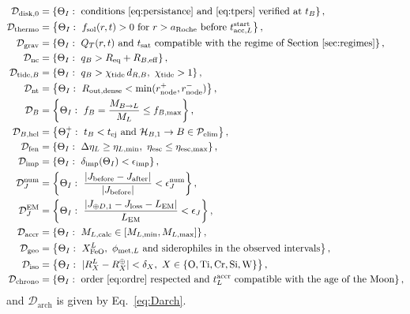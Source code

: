 \documentclass[11pt,a4paper,openany]{report}
\newcommand{\Req}{R_{\mathrm{eq}}}
\newcommand{\aR}{a_{\mathrm{Roche}}}
\begin{document}
\begin{align}
\mathcal{D}_{\mathrm{disk},0}&=\left\{\Theta_I:\ \text{conditions~\eqref{eq:persistance} and~\eqref{eq:tpers} verified at }t_B\right\},
\label{eq:Ddisque}\\
\mathcal{D}_{\mathrm{thermo}}&=\left\{\Theta_I:\ f_{\mathrm{sol}}(r,t)>0\ \text{for }r>\aR\ \text{before }
t^{\mathrm{start}}_{\mathrm{acc},L}\right\},
\label{eq:Dthermo}\\
\mathcal{D}_{\mathrm{grav}}&=\left\{\Theta_I:\ Q_T(r,t)\ \text{and}\ t_{\mathrm{sat}}\ \text{compatible with the regime of Section~\ref{sec:regimes}}\right\},
\label{eq:Dgrav}\\
\mathcal{D}_{\mathrm{nc}}&=\left\{\Theta_I:\ q_B>\Req+R_{B,\mathrm{eff}}\right\},
\label{eq:Dnc}\\
\mathcal{D}_{\mathrm{tide},B}&=\left\{\Theta_I:\ q_B>\chi_{\mathrm{tide}}\,d_{R,B},\ \chi_{\mathrm{tide}}>1\right\},
\label{eq:DtideB}\\
\mathcal{D}_{\mathrm{nt}}&=\left\{\Theta_I:\ R_{\mathrm{out,dense}}<\min(r^{+}_{\text{node}},r^{-}_{\text{node}})\right\},
\label{eq:Dnt}\\
\mathcal{D}_{B}&=\left\{\Theta_I:\ f_B=\frac{M_{B\to L}}{M_L}\le f_{B,\max}\right\},
\label{eq:DB}\\
\mathcal{D}_{B,\mathrm{hel}}&=\left\{\Theta_I^{+}:\ t_B<t_{\mathrm{ej}}
\text{ and }\mathcal{H}_{B,1}\to B\in\mathcal{P}_{\mathrm{elim}}\right\},
\label{eq:DBhel}\\
\mathcal{D}_{\mathrm{fen}}&=\left\{\Theta_I:\ \Delta\eta_L\ge\eta_{L,\min},\ \eta_{\mathrm{esc}}\le\eta_{\mathrm{esc},\max}\right\},
\label{eq:Dfen}\\
\mathcal{D}_{\mathrm{imp}}&=\left\{\Theta_I:\ \delta_{\mathrm{imp}}(\Theta_I)<\epsilon_{\mathrm{imp}}\right\},
\label{eq:Dimp}\\
\mathcal{D}_{J}^{\mathrm{num}}&=\left\{\Theta_I:\ \frac{|J_{\mathrm{before}}-J_{\mathrm{after}}|}{|J_{\mathrm{before}}|}<\epsilon_J^{\mathrm{num}}\right\},
\label{eq:DJ}\\
\mathcal{D}_{J}^{\mathrm{EM}}&=\left\{\Theta_I:\ \frac{|J_{\oplus D,1}-J_{\mathrm{loss}}-L_{\mathrm{EM}}|}{L_{\mathrm{EM}}}<\epsilon_J\right\},
\label{eq:DJEM}\\
\mathcal{D}_{\mathrm{accr}}&=\left\{\Theta_I:\ M_{L,\mathrm{calc}}\in[M_{L,\min},M_{L,\max}]\right\},
\label{eq:Daccr}\\
\mathcal{D}_{\mathrm{geo}}&=\left\{\Theta_I:\ X^L_{\mathrm{FeO}},\ \phi_{\mathrm{met},L}\ \text{and siderophiles in the observed intervals}\right\},
\label{eq:Dgeo}\\
\mathcal{D}_{\mathrm{iso}}&=\left\{\Theta_I:\ |R_X^L-R_X^\oplus|<\delta_X,\ X\in\{\mathrm{O},\mathrm{Ti},\mathrm{Cr},\mathrm{Si},\mathrm{W}\}\right\},
\label{eq:Diso}\\
\mathcal{D}_{\mathrm{chrono}}&=\left\{\Theta_I:\ \text{order~\eqref{eq:ordre} respected and }
t^{\mathrm{accr}}_L\ \text{compatible with the age of the Moon}\right\},
\label{eq:Dchrono}
\end{align}
and $\mathcal{D}_{\mathrm{arch}}$ is given by Eq.~\eqref{eq:Darch}.
\end{document}
